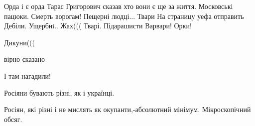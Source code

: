 \begin{itemize}


Орда і є орда
Тарас Григорович сказав хто вони є ще за життя.
Московські пацюки.
Смерть ворогам!
Пещерні людці...
Твари
На страницу уефа отправить
Дебіли.
Ущербнi..
Жах(((
Тварі.
Підарашисти
Варвари! Орки!

Дикуни(((

вірно сказано

І там нагадили!

Росіяни бувають різні, як і українці.

Росіян, які різні і не мислять як окупанти,-абсолютний мінімум. Мікроскопічний обсяг.


\end{itemize}
